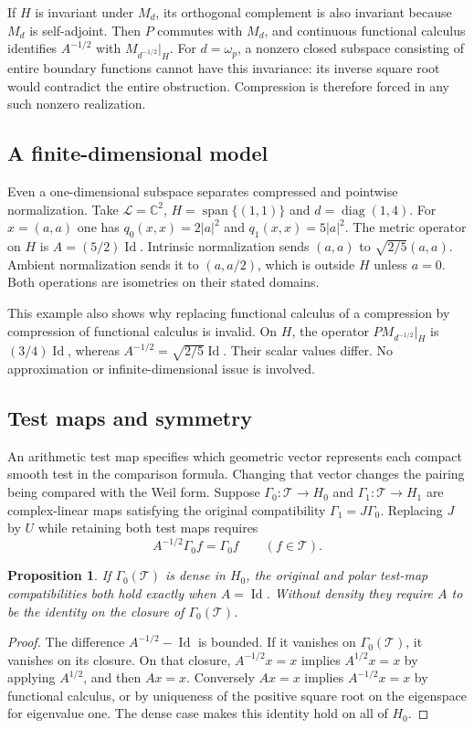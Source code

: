 \documentclass[11pt,letterpaper]{article}
\newtheorem{proposition}[theorem]{Proposition}
\theoremstyle{definition}
\theoremstyle{remark}
\newcommand{\C}{\mathbb C}
\newcommand{\T}{\mathcal T}
\newcommand{\Id}{\operatorname{Id}}
\newcommand{\Span}{\operatorname{span}}
\begin{document}
If $H$ is invariant under $M_d$, its orthogonal complement is
also invariant because $M_d$ is self-adjoint. Then $P$ commutes
with $M_d$, and continuous functional calculus identifies
$A^{-1/2}$ with $M_{d^{-1/2}}|_H$. For $d=\omega_p$, a nonzero
closed subspace consisting of entire boundary functions cannot
have this invariance: its inverse square root would contradict
the entire obstruction. Compression is therefore forced in
any such nonzero realization.

\subsection{A finite-dimensional model}

Even a one-dimensional subspace separates compressed and
pointwise normalization. Take $\mathcal L=\C^2$,
$H=\Span\{(1,1)\}$ and $d=\operatorname{diag}(1,4)$.
For $x=(a,a)$ one has $q_0(x,x)=2|a|^2$ and
$q_1(x,x)=5|a|^2$. The metric operator on $H$ is
$A=(5/2)\Id$. Intrinsic normalization sends
$(a,a)$ to $\sqrt{2/5}(a,a)$. Ambient normalization sends it
to $(a,a/2)$, which is outside $H$ unless $a=0$.
Both operations are isometries on their stated domains.

This example also shows why replacing functional calculus of
a compression by compression of functional calculus is invalid.
On $H$, the operator $PM_{d^{-1/2}}|_H$ is $(3/4)\Id$,
whereas $A^{-1/2}=\sqrt{2/5}\Id$. Their scalar values differ.
No approximation or infinite-dimensional issue is involved.

\subsection{Test maps and symmetry}

An arithmetic test map specifies which geometric vector represents
each compact smooth test in the comparison formula. Changing
that vector changes the pairing being compared with the Weil form.
Suppose $\Gamma_0:\T\to H_0$ and
$\Gamma_1:\T\to H_1$ are complex-linear maps satisfying the
original compatibility $\Gamma_1=J\Gamma_0$. Replacing $J$
by $U$ while retaining both test maps requires
\begin{equation}
 A^{-1/2}\Gamma_0f=\Gamma_0f\qquad(f\in\T).
 \label{eq:test-rigidity}
\end{equation}

\begin{proposition}
\label{prop:test-rigidity}
If $\Gamma_0(\T)$ is dense in $H_0$, the original and polar
test-map compatibilities both hold exactly when $A=\Id$.
Without density they require $A$ to be the identity on the
closure of $\Gamma_0(\T)$.
\end{proposition}
\begin{proof}
The difference $A^{-1/2}-\Id$ is bounded. If it vanishes on
$\Gamma_0(\T)$, it vanishes on its closure. On that closure,
$A^{-1/2}x=x$ implies $A^{1/2}x=x$ by applying $A^{1/2}$,
and then $Ax=x$. Conversely $Ax=x$ implies
$A^{-1/2}x=x$ by functional calculus, or by uniqueness of
the positive square root on the eigenspace for eigenvalue one.
The dense case makes this identity hold on all of $H_0$.
\end{proof}
\end{document}
